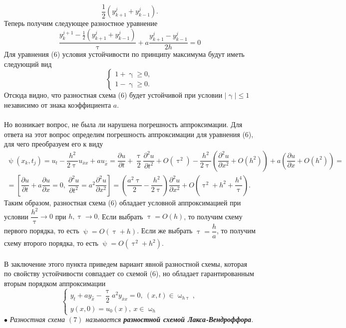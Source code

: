 \documentclass[a4paper, 12pt]{report}
\numberwithin{equation}{section}
\newcommand{\ol}{\overline}
\renewcommand{\leq}{\leqslant}
\renewcommand{\geq}{\geqslant}
\renewcommand{\gamma}{\upgamma}
\renewcommand{\tau}{\uptau}
\renewcommand{\psi}{\uppsi}
\renewcommand{\omega}{\upomega}
\renewcommand{\d}{\partial}
\begin{document}
 $$\dfrac 12 (y_{k+1}^j + y_{k-1}^j).$$
 Теперь получим следующее разностное уравнение
 \begin{equation}
	 	\dfrac{y_k^{j+1} - \frac 12 (y_{k+1}^j + y_{k-1}^j) }{\tau} + a \dfrac{y_{k+1}^j - y_{k-1}^j}{2h} = 0 
 \end{equation}
 Для уравнения (6) условия устойчивости по принципу максимума будут иметь следующий вид
 $$\begin{cases}
	 	1+\gamma \geq 0,\\
	 	1 - \gamma \geq 0.
 \end{cases}$$
 Отсюда видно, что разностная схема (6) будет устойчивой при условии $|\gamma|\leq 1$ независимо от знака коэффициента $a$.\\\\
 Но возникает вопрос, не была ли нарушена погрешность аппроксимации. Для ответа на этот вопрос определим погрешность аппроксимации для уравнения (6), для чего преобразуем его к виду
 \begin{multline*}
	 	\psi(x_k, t_j) = u_t - \dfrac{h^2}{2\tau} u_{\ol x x} + a u_{\overset{\circ}x} = \dfrac{\d u}{\d t} + \dfrac \tau 2 \dfrac{\d ^2 u}{\d t^2} + O(\tau^2) - \dfrac {h^2}{2\tau} \left( \dfrac{\d ^2u}{\d x^2} + O(h^2) \right) + a \left(\dfrac {\d u}{\d x} + O(h^2)\right)=\\
	 	=\left[ \dfrac{\d u}{\d t}+ a \dfrac{\d u}{\d x} = 0,\ \dfrac{\d^2 u}{\d t^2}= a^2 \dfrac{\d^2 u}{\d x^2}\right] = \left(\dfrac{a^2 \tau}{2} - \dfrac {h^2}{2\tau}\right)\dfrac{\d ^2u}{\d x^2} + O(\tau^2 + h^2 + \dfrac {h^4}\tau).
 \end{multline*}
 Таким образом, разностная схема (6) обладает условной аппроксимацией при условии $\dfrac {h^2}\tau \to 0$ при $h,\tau \to 0$. Если выбрать $\tau = O(h)$, то получим схему первого порядка, то есть $\psi = O(\tau + h)$. Если же выбрать $\tau = \dfrac h a$, то получим схему второго порядка, то есть
 $\psi = O(\tau^2 + h^2)$.
 \\\\
 В заключение этого пункта приведем вариант явной разностной схемы, которая по свойству устойчивости совпадает со схемой (6), но обладает гарантированным вторым порядком аппроксимации
 \begin{equation}
	 	\begin{cases}
	 		y_t + ay_{\overset{\circ}x} - \dfrac \tau 2 a^2 y_{\ol x x} = 0,\ (x,t) \in \omega_{h\tau},\\
	 		y(x,0) = u_0(x),\ x \in \omega_h
	 	\end{cases}
 \end{equation}
 $\bullet$ \textit{Разностная схема $(7)$ называется \textbf{разностной схемой Лакса-Вендроффора}.}
\end{document}
